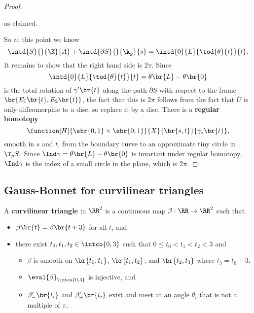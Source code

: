 \begin{proof}
\begin{itemize}
as claimed.
\end{itemize}
So at this point we know
$$ \intd{S}{}{\K}{A} + \intd{\partial S}{}{\k_g}{s} = \intd{0}{L}{\tod{\theta}{t}}{t}. $$
It remains to show that the right hand side is $ 2\pi $. Since
$$ \intd{0}{L}{\tod{\theta}{t}}{t} = \theta\br{L} - \theta\br{0} $$
is the total rotation of $ \gamma'\br{t} $ along the path $ \partial S $ with respect to the frame $ \br{E_1\br{t}, E_2\br{t}} $, the fact that this is $ 2\pi $ follows from the fact that $ \overline{U} $ is only diffeomorphic to a disc, so replace it by a disc. There is a \textbf{regular homotopy}
$$ \function[H]{\sbr{0, 1} \times \sbr{0, 1}}{X}{\br{s, t}}{\gamma_s\br{t}}, $$
smooth in $ s $ and $ t $, from the boundary curve to an approximate tiny circle in $ \T_p S $. Since $ \Ind \gamma = \theta\br{L} - \theta\br{0} $ is invariant under regular homotopy, $ \Ind \gamma $ is the index of a small circle in the plane, which is $ 2\pi $.
\end{proof}

\pagebreak

\subsection{Gauss-Bonnet for curvilinear triangles}


\begin{definition}
A \textbf{curvilinear triangle} in $ \RR^2 $ is a continuous map $ \beta : \RR \to \RR^2 $ such that
\begin{itemize}
\item $ \beta\br{t} = \beta\br{t + 3} $ for all $ t $, and
\item there exist $ t_0, t_1, t_2 \in \intco{0, 3} $ such that $ 0 \le t_0 < t_1 < t_2 < 3 $ and
\begin{itemize}
\item $ \beta $ is smooth on $ \br{t_0, t_1} $, $ \br{t_1, t_2} $, and $ \br{t_2, t_3} $ where $ t_3 = t_0 + 3 $,
\item $ \eval{\beta}_{\intco{0, 3}} $ is injective, and
\item $ \beta_-'\br{t_i} $ and $ \beta_+'\br{t_i} $ exist and meet at an angle $ \theta_i $ that is not a multiple of $ \pi $.
\end{itemize}
\end{itemize}
\end{definition}

